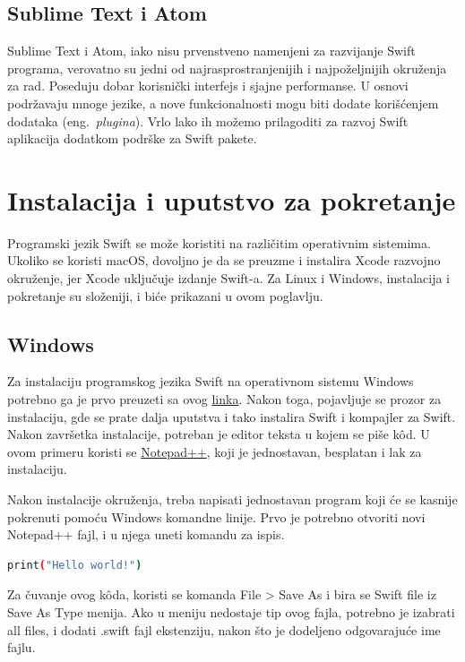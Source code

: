 \documentclass[a4paper]{article}
\begin{document}
\subsection{Sublime Text i Atom}
\label{subsec:podnaslovAtom}
Sublime Text i Atom, iako nisu prvenstveno namenjeni za razvijanje Swift programa, verovatno su jedni od najrasprostranjenijih i najpoželjnijih okruženja za rad. Poseduju dobar korisnički interfejs i sjajne performanse. U osnovi podržavaju mnoge jezike, a nove funkcionalnosti mogu biti dodate korišćenjem dodataka (eng.~{\em plugina}). Vrlo lako ih možemo prilagoditi za razvoj Swift aplikacija dodatkom podrške za Swift pakete.

\section{Instalacija i uputstvo za pokretanje}	
\label{sec:sestiDeo}
Programski jezik Swift se može koristiti na različitim operativnim sistemima. Ukoliko se koristi macOS, dovoljno je da se preuzme i instalira Xcode razvojno okruženje, jer Xcode uključuje izdanje Swift-a. Za Linux i Windows, instalacija i pokretanje su složeniji, i biće prikazani u ovom poglavlju.

\subsection{Windows}
\label{subsec:podnaslovWindows}
Za instalaciju programskog jezika Swift na operativnom sistemu Windows potrebno ga je prvo preuzeti sa ovog \href{https://swiftforwindows.github.io}{linka}. Nakon toga, pojavljuje se prozor za instalaciju, gde se prate dalja uputstva i tako instalira Swift i kompajler za Swift. Nakon završetka instalacije, potreban je editor teksta u kojem se piše k\^{o}d. U ovom primeru koristi se \href{https://notepad-plus-plus.org/download/v7.6.4.html}{Notepad++}, koji je jednostavan, besplatan i lak za instalaciju.

Nakon instalacije okruženja, treba napisati jednostavan program koji će se kasnije pokrenuti pomoću Windows komandne linije. Prvo je potrebno otvoriti novi Notepad++ fajl, i u njega uneti komandu za ispis.

\begin{lstlisting}[language=bash, caption={Primer komande}]
print("Hello world!")
\end{lstlisting}

Za čuvanje ovog k\^{o}da, koristi se komanda File > Save As i bira se Swift file iz Save As Type menija. Ako u meniju nedostaje tip ovog fajla, potrebno je izabrati all files, i dodati .swift fajl ekstenziju, nakon što je dodeljeno odgovarajuće ime fajlu.
\end{document}
